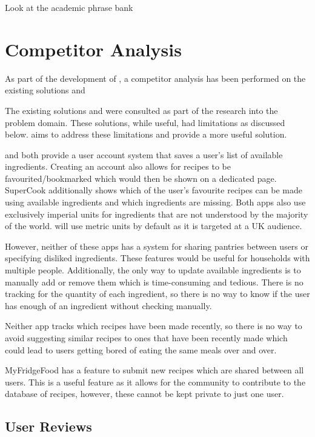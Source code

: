{    Look at the academic phrase bank
}

\section{Competitor Analysis}
\label{sec:competitor_analysis}
As part of the development of \chef{}, a competitor analysis has been performed on the existing solutions \cite{myfridgefood_myfridgefood_nodate} and \cite{supercook_supercook_nodate}

The existing solutions \cite{myfridgefood_myfridgefood_nodate} and \cite{supercook_supercook_nodate} were consulted
as part of the research into the problem domain. These solutions, while useful, had limitations as discussed below.
\chef{} aims to address these limitations and provide a more useful solution.

\cite{myfridgefood_myfridgefood_nodate} and \cite{supercook_supercook_nodate} both provide a user account system
that saves a user's list of available ingredients. Creating an account also allows for recipes to be favourited/bookmarked
which would then be shown on a dedicated page. SuperCook additionally shows which of the user's favourite recipes
can be made using available ingredients and which ingredients are missing. Both apps also use exclusively imperial
units for ingredients that are not understood by the majority of the world. \chef{} will use metric units by default
as it is targeted at a UK audience.

However, neither of these apps has a system for sharing pantries between users or specifying disliked ingredients. These features would be useful for households with multiple people.
Additionally, the only way to update available ingredients is to manually add or remove them which is time-consuming and tedious. There is no tracking for the quantity of
each ingredient, so there is no way to know if the user has enough of an ingredient without checking manually.

Neither app tracks which recipes have been made recently, so there is no way to avoid suggesting similar recipes to ones that have been recently made which could lead to
users getting bored of eating the same meals over and over.

MyFridgeFood has a feature to submit new recipes which are shared between all users. This is a useful feature as it allows for the community to contribute to the database
of recipes, however, these cannot be kept private to just one user.

\subsection{User Reviews}

